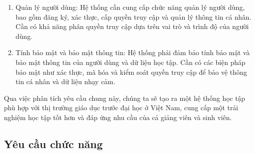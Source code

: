 \documentclass[../Thesis.tex]{subfiles}
\begin{document}
\begin{enumerate}
            \item Quản lý người dùng:
            Hệ thống cần cung cấp chức năng quản lý người dùng, bao gồm đăng ký, xác thực, cấp quyền truy cập và quản lý thông tin cá nhân.
            Cần có khả năng phân quyền truy cập dựa trên vai trò và trình độ của người dùng.
            
            \item Tính bảo mật và bảo mật thông tin:
            Hệ thống phải đảm bảo tính bảo mật và bảo mật thông tin của người dùng và dữ liệu học tập.
            Cần có các biện pháp bảo mật như xác thực, mã hóa và kiểm soát quyền truy cập để bảo vệ thông tin cá nhân và dữ liệu nhạy cảm.
        \end{enumerate}

        Qua việc phân tích yêu cầu chung này, chúng ta sẽ tạo ra một hệ thống học tập phù hợp với thị trường giáo dục trước đại học ở Việt Nam, cung cấp một trải nghiệm học tập tốt hơn và đáp ứng nhu cầu của cả giảng viên và sinh viên.  
    
    \subsection{Yêu cầu chức năng}
    \renewcommand{\thesubsubsection}{\alph{subsubsection}.}
\end{document}
